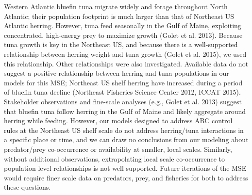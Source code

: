 \documentclass[]{article}
\begin{document}
Western Atlantic bluefin tuna migrate widely and forage throughout North
Atlantic; their population footprint is much larger than that of
Northeast US Atlantic herring. However, tuna feed seasonally in the Gulf
of Maine, exploiting concentrated, high-energy prey to maximize growth
(Golet et al. 2013). Because tuna growth is key in the Northeast US, and
because there is a well-supported relationship between herring weight
and tuna growth (Golet et al. 2015), we used this relationship. Other
relationships were also investigated. Available data do not suggest a
positive relationship between herring and tuna populations in our models
for this MSE; Northeast US shelf herring have increased during a period
of bluefin tuna decline (Northeast Fisheries Science Center 2012, ICCAT
2015). Stakeholder observations and fine-scale analyses (e.g., Golet et
al. 2013) suggest that bluefin tuna follow herring in the Gulf of Maine
and likely aggregate around herring while feeding. However, our models
designed to address ABC control rules at the Northeast US shelf scale do
not address herring/tuna interactions in a specific place or time, and
we can draw no conclusions from our modeling about predator/prey
co-occurrence or availability at smaller, local scales. Similarly,
without additional observations, extrapolating local scale co-occurrence
to population level relationships is not well supported. Future
iterations of the MSE would require finer scale data on predators, prey,
and fisheries for both to address these questions.
\end{document}
